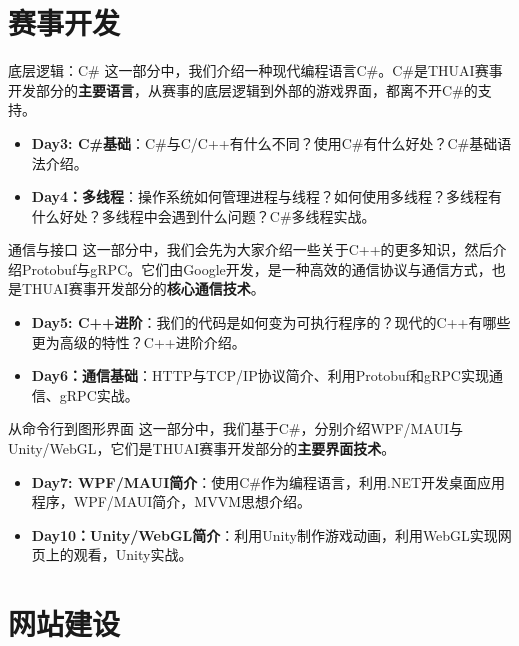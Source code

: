 \documentclass{beamer}
\begin{document}
    \section{赛事开发}

    \begin{frame}{底层逻辑：C\#}
        这一部分中，我们介绍一种现代编程语言C\#。C\#是THUAI赛事开发部分的\textbf{主要语言}，从赛事的底层逻辑到外部的游戏界面，都离不开C\#的支持。
        \begin{itemize}
            \item \textbf{Day3: C\#基础}：C\#与C/C++有什么不同？使用C\#有什么好处？C\#基础语法介绍。
            \item \textbf{Day4：多线程}：操作系统如何管理进程与线程？如何使用多线程？多线程有什么好处？多线程中会遇到什么问题？C\#多线程实战。
        \end{itemize}
    \end{frame}

    \begin{frame}{通信与接口}
        这一部分中，我们会先为大家介绍一些关于C++的更多知识，然后介绍Protobuf与gRPC。它们由Google开发，是一种高效的通信协议与通信方式，也是THUAI赛事开发部分的\textbf{核心通信技术}。
        \begin{itemize}
            \item \textbf{Day5: C++进阶}：我们的代码是如何变为可执行程序的？现代的C++有哪些更为高级的特性？C++进阶介绍。
            \item \textbf{Day6：通信基础}：HTTP与TCP/IP协议简介、利用Protobuf和gRPC实现通信、gRPC实战。
        \end{itemize}
    \end{frame}

    \begin{frame}{从命令行到图形界面}
        这一部分中，我们基于C\#，分别介绍WPF/MAUI与Unity/WebGL，它们是THUAI赛事开发部分的\textbf{主要界面技术}。
        \begin{itemize}
            \item \textbf{Day7: WPF/MAUI简介}：使用C\#作为编程语言，利用.NET开发桌面应用程序，WPF/MAUI简介，MVVM思想介绍。
            \item \textbf{Day10：Unity/WebGL简介}：利用Unity制作游戏动画，利用WebGL实现网页上的观看，Unity实战。
        \end{itemize}
    \end{frame}

    \section{网站建设}
\end{document}
